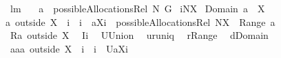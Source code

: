 \begin{isabellebody}
{\isafoldproof}%
%
\isadelimproof
%
\endisadelimproof
\isanewline
\isanewline
{}\isamarkupfalse%
\ lm{}{}{\isacharcolon}\ \ \ \isanewline
{\isachardoublequoteopen}a\ {\isasymin}\ possibleAllocationsRel\ N\ G{\isachardoublequoteclose}\ \isanewline
{\isachardoublequoteopen}i{\isasymin}N{\isacharminus}X{\isachardoublequoteclose}\ \isanewline
{\isachardoublequoteopen}Domain\ a\ {\isasyminter}\ X\ {\isasymnoteq}\ {\isacharbraceleft}{\isacharbraceright}{\isachardoublequoteclose}\ \isanewline
{}\ \isanewline
{\isachardoublequoteopen}a\ outside\ {\isacharparenleft}X\ {\isasymunion}\ {\isacharbraceleft}i{\isacharbraceright}{\isacharparenright}\ {\isasymunion}\ {\isacharparenleft}{\isacharbraceleft}i{\isacharbraceright}\ {\isasymtimes}\ {\isacharbraceleft}{\isasymUnion}{\isacharparenleft}a{\isacharbackquote}{\isacharbackquote}{\isacharparenleft}X{\isasymunion}{\isacharbraceleft}i{\isacharbraceright}{\isacharparenright}{\isacharparenright}{\isacharbraceright}{\isacharparenright}\ {\isasymin}\ possibleAllocationsRel\ {\isacharparenleft}N{\isacharminus}X{\isacharparenright}\ {\isacharparenleft}{\isasymUnion}\ {\isacharparenleft}Range\ a{\isacharparenright}{\isacharparenright}{\isachardoublequoteclose}\isanewline
%
\isadelimproof
%
\endisadelimproof
%
\isatagproof
{}\isamarkupfalse%
\ {\isacharminus}\isanewline
\ \ \isamarkupfalse%
\ {\isacharquery}R{\isacharequal}{\isachardoublequoteopen}a\ outside\ X{\isachardoublequoteclose}\ \isamarkupfalse%
\ {\isacharquery}I{\isacharequal}{\isachardoublequoteopen}{\isacharbraceleft}i{\isacharbraceright}{\isachardoublequoteclose}\ \isamarkupfalse%
\ {\isacharquery}U{\isacharequal}Union\ \isamarkupfalse%
\ {\isacharquery}u{\isacharequal}runiq\ \isamarkupfalse%
\ {\isacharquery}r{\isacharequal}Range\ \isamarkupfalse%
\ {\isacharquery}d{\isacharequal}Domain\isanewline
\ \ \isamarkupfalse%
\ {\isacharquery}aa{\isacharequal}{\isachardoublequoteopen}a\ outside\ {\isacharparenleft}X\ {\isasymunion}\ {\isacharbraceleft}i{\isacharbraceright}{\isacharparenright}\ {\isasymunion}\ {\isacharparenleft}{\isacharbraceleft}i{\isacharbraceright}\ {\isasymtimes}\ {\isacharbraceleft}{\isacharquery}U{\isacharparenleft}a{\isacharbackquote}{\isacharbackquote}{\isacharparenleft}X{\isasymunion}{\isacharbraceleft}i{\isacharbraceright}{\isacharparenright}{\isacharparenright}{\isacharbraceright}{\isacharparenright}{\isachardoublequoteclose}\ \isamarkupfalse%

\end{isabellebody}
